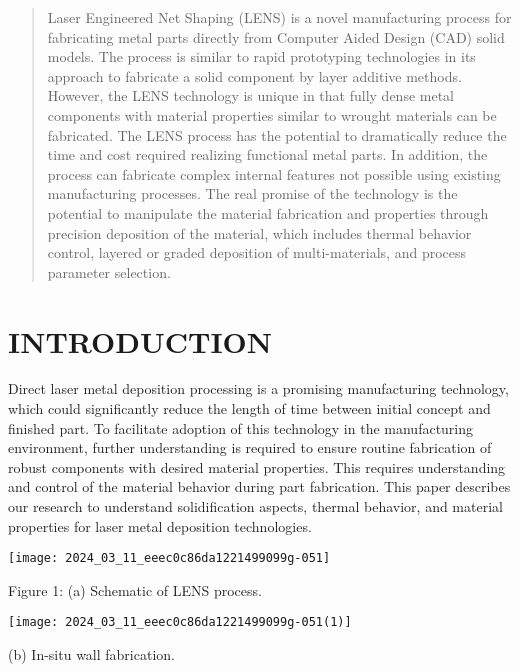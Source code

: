 \documentclass[10pt]{article}
\begin{document}
\begin{abstract}
Laser Engineered Net Shaping (LENS) is a novel manufacturing process for fabricating metal parts directly from Computer Aided Design (CAD) solid models. The process is similar to rapid prototyping technologies in its approach to fabricate a solid component by layer additive methods. However, the LENS technology is unique in that fully dense metal components with material properties similar to wrought materials can be fabricated. The LENS process has the potential to dramatically reduce the time and cost required realizing functional metal parts. In addition, the process can fabricate complex internal features not possible using existing manufacturing processes. The real promise of the technology is the potential to manipulate the material fabrication and properties through precision deposition of the material, which includes thermal behavior control, layered or graded deposition of multi-materials, and process parameter selection.
\end{abstract}

\section*{INTRODUCTION}
Direct laser metal deposition processing is a promising manufacturing technology, which could significantly reduce the length of time between initial concept and finished part. To facilitate adoption of this technology in the manufacturing environment, further understanding is required to ensure routine fabrication of robust components with desired material properties. This requires understanding and control of the material behavior during part fabrication. This paper describes our research to understand solidification aspects, thermal behavior, and material properties for laser metal deposition technologies.

\begin{center}
\texttt{[image: 2024\_03\_11\_eeec0c86da1221499099g-051]}
\end{center}

Figure 1: (a) Schematic of LENS process.

\begin{center}
\texttt{[image: 2024\_03\_11\_eeec0c86da1221499099g-051(1)]}
\end{center}

(b) In-situ wall fabrication.
\end{document}
